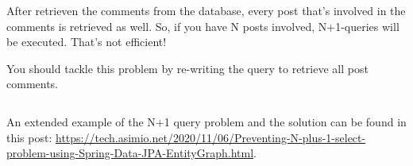 After retrieven the comments from the database, every post that's involved in the comments is retrieved as well. So, if you have N posts involved, N+1-queries will be executed. That's not efficient!

You should tackle this problem by re-writing the query to retrieve all post comments.

\begin{lstlisting}

\end{lstlisting}


An extended example of the N+1 query problem and the solution can be found in this post: \url{https://tech.asimio.net/2020/11/06/Preventing-N-plus-1-select-problem-using-Spring-Data-JPA-EntityGraph.html}.

